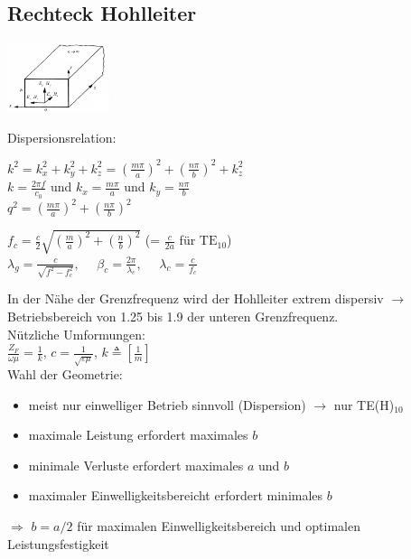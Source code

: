 \documentclass[english]{latex4ei/latex4ei_sheet}
\begin{document}
\begin{sectionbox}
	\subsection{Rechteck Hohlleiter}

	\begin{center}\includegraphics[width = 3cm]{./img/hl-orientierung.png}\end{center}

	Dispersionsrelation:
	\begin{emphbox}
		$k^2=k_x^2 + k_y^2 + k_z^2 = (\frac{m\pi}{a})^2+(\frac{n\pi}{b})^2 + k_z^2$\\
		$k = \frac{2 \pi f}{c_0}$ und $k_x = \frac{m\pi}{a}$ und $k_y = \frac{n\pi}{b}$\\
		$q^2 = (\frac{m\pi}{a})^2+(\frac{n\pi}{b})^2$
	\end{emphbox}
	
	\begin{emphbox}
		$f_c = \frac{c}{2}\sqrt{\left(\frac{m}{a}\right)^2+\left(\frac{n}{b}\right)^2}$ (= $\frac{c}{2a}$ für $\text{TE}_{10}$)\\
		$\lambda_g = \frac{c}{\sqrt{f^2 - f_c^2}},\quad$ $\beta_c = \frac{2\pi}{\lambda_c},\quad$ $\lambda_c = \frac{c}{f_c}$\\
	\end{emphbox}

	In der Nähe der Grenzfrequenz wird der Hohlleiter extrem dispersiv $\rightarrow$ Betriebsbereich von 1.25 bis 1.9 der unteren Grenzfrequenz.\\

	Nützliche Umformungen:\\
	$\frac{Z_F}{\omega\mu} = \frac{1}{k}$, 
	$c=\frac{1}{\sqrt{\varepsilon \mu}}$, 
	$k \triangleq \left[\frac{1}{m}\right] $\\
	
	Wahl der Geometrie:
	\begin{itemize}
		\item meist nur einwelliger Betrieb sinnvoll (Dispersion) $\rightarrow$ nur TE(H)$_{10}$
		\item maximale Leistung erfordert maximales $b$
		\item minimale Verluste erfordert maximales $a$ und $b$
		\item maximaler Einwelligkeitsbereicht erfordert minimales $b$
	\end{itemize}
	$\Rightarrow$ $b = a / 2$ für maximalen Einwelligkeitsbereich und optimalen Leistungsfestigkeit\\


\end{sectionbox}
\end{document}
